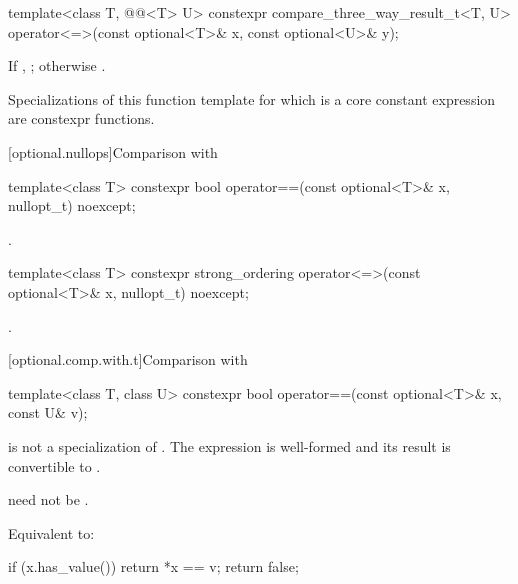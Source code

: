 %
\begin{itemdecl}
template<class T, @@<T> U>
  constexpr compare_three_way_result_t<T, U>
    operator<=>(const optional<T>& x, const optional<U>& y);
\end{itemdecl}

\begin{itemdescr}
\pnum
\returns
If , ; otherwise .

\pnum
\remarks
Specializations of this function template
for which  is a core constant expression
are constexpr functions.
\end{itemdescr}

[optional.nullops]{Comparison with }

%
\begin{itemdecl}
template<class T> constexpr bool operator==(const optional<T>& x, nullopt_t) noexcept;
\end{itemdecl}

\begin{itemdescr}
\pnum
\returns
{}.
\end{itemdescr}

%
\begin{itemdecl}
template<class T> constexpr strong_ordering operator<=>(const optional<T>& x, nullopt_t) noexcept;
\end{itemdecl}

\begin{itemdescr}
\pnum
\returns
{}.
\end{itemdescr}

[optional.comp.with.t]{Comparison with }

%
\begin{itemdecl}
template<class T, class U> constexpr bool operator==(const optional<T>& x, const U& v);
\end{itemdecl}

\begin{itemdescr}
\pnum
\constraints
{} is not a specialization of .
The expression  is well-formed and
its result is convertible to .
\begin{note}
 need not be .
\end{note}

\pnum
\effects
Equivalent to:
\begin{codeblock}
if (x.has_value())
  return *x == v;
return false;
\end{codeblock}
\end{itemdescr}

